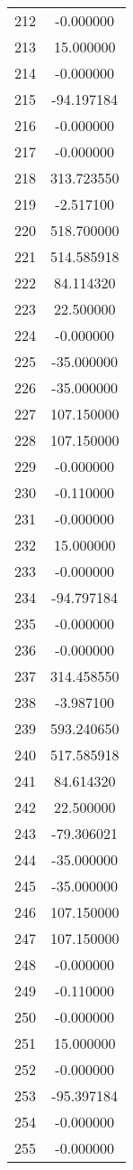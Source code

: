 \documentclass[12pt]{article}
\begin{document}
\begin{longtable}{@{}cc@{}}
212 & -0.000000 \\
213 & 15.000000 \\
214 & -0.000000 \\
215 & -94.197184 \\
216 & -0.000000 \\
217 & -0.000000 \\
218 & 313.723550 \\
219 & -2.517100 \\
220 & 518.700000 \\
221 & 514.585918 \\
222 & 84.114320 \\
223 & 22.500000 \\
224 & -0.000000 \\
225 & -35.000000 \\
226 & -35.000000 \\
227 & 107.150000 \\
228 & 107.150000 \\
229 & -0.000000 \\
230 & -0.110000 \\
231 & -0.000000 \\
232 & 15.000000 \\
233 & -0.000000 \\
234 & -94.797184 \\
235 & -0.000000 \\
236 & -0.000000 \\
237 & 314.458550 \\
238 & -3.987100 \\
239 & 593.240650 \\
240 & 517.585918 \\
241 & 84.614320 \\
242 & 22.500000 \\
243 & -79.306021 \\
244 & -35.000000 \\
245 & -35.000000 \\
246 & 107.150000 \\
247 & 107.150000 \\
248 & -0.000000 \\
249 & -0.110000 \\
250 & -0.000000 \\
251 & 15.000000 \\
252 & -0.000000 \\
253 & -95.397184 \\
254 & -0.000000 \\
255 & -0.000000 \\

\end{longtable}
\end{document}
